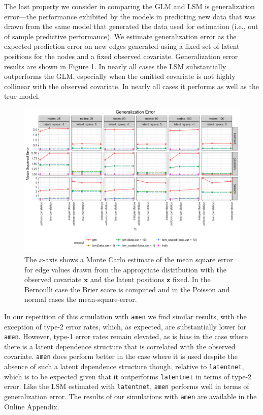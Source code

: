 \documentclass[11pt]{article}
\begin{document}
The last property we consider in comparing the GLM and LSM is generalization error---the performance exhibited by the models in predicting new data that was drawn from the same model that generated the data used for estimation (i.e., out of sample predictive performance). We estimate generalization error as the expected prediction error on new edges generated using a fixed set of latent positions for the nodes and a fixed observed covariate. Generalization error results are shown in Figure \ref{fig:generalization}. In nearly all cases the LSM substantially outperforms the GLM, especially when the omitted covariate is not highly collinear with the observed covariate. In nearly all cases it performs as well as the true model.

\begin{figure}
\includegraphics[width=\textwidth]{figures/generalization.png}
\caption{The $x$-axis shows a Monte Carlo estimate of the mean square error for edge values drawn from the appropriate distribution with the observed covariate $\mathbf{x}$ and the latent positions $\mathbf{z}$ fixed. In the Bernoulli case the Brier score is computed and in the Poisson and normal cases the mean-square-error. \label{fig:generalization}}
\end{figure}

In our repetition of this simulation with \texttt{amen} we find similar results, with the exception of type-2 error rates, which, as expected, are substantially lower for \texttt{amen}. However, type-1 error rates remain elevated, as is bias in the case where there is a latent dependence structure that is correlated with the observed covariate. \texttt{amen} does perform better in the case where it is used despite the absence of such a latent dependence structure though, relative to \texttt{latentnet}, which is to be expected given that it outperforms \texttt{latentnet} in terms of type-2 error. Like the LSM estimated with \texttt{latentnet}, \texttt{amen} performs well in terms of generalization error. The results of our simulations with \texttt{amen} are available in the Online Appendix.
\end{document}
